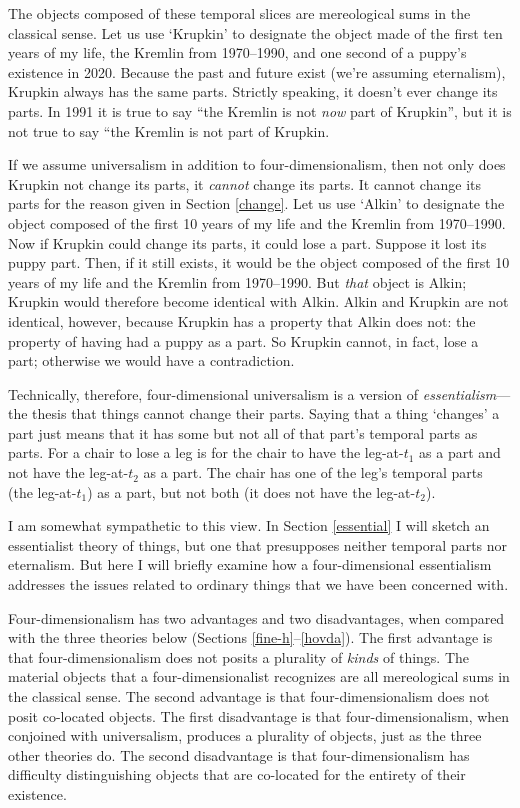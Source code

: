 \documentclass[11pt]{article}
\begin{document}
\begin{spacing}{1.5}
The objects composed of these temporal slices are mereological sums in
the classical sense.  Let us use `Krupkin' to designate the object
made of the first ten years of my life, the Kremlin from 1970--1990,
and one second of a puppy's existence in 2020.  Because the past and
future exist (we're assuming eternalism), Krupkin always has the same
parts.  Strictly speaking, it doesn't ever change its parts.  In 1991
it is true to say ``the Kremlin is not {\em now} part of Krupkin'',
but it is not true to say ``the Kremlin is not part of Krupkin.

If we assume universalism in addition to four-dimensionalism, then not
only does Krupkin not change its parts, it {\em cannot} change its
parts.  It cannot change its parts for the reason given in Section
\ref{change}.  Let us use `Alkin' to designate the object composed of
the first 10 years of my life and the Kremlin from 1970--1990.  Now if
Krupkin could change its parts, it could lose a part.  Suppose it lost
its puppy part.  Then, if it still exists, it would be the object
composed of the first 10 years of my life and the Kremlin from
1970--1990.  But {\em that} object is Alkin; Krupkin would therefore
become identical with Alkin.  Alkin and Krupkin are not identical,
however, because Krupkin has a property that Alkin does not: the
property of having had a puppy as a part.  So Krupkin cannot, in fact,
lose a part; otherwise we would have a contradiction.

Technically, therefore, four-dimensional universalism is a version of
{\em essentialism}---the thesis that things cannot change their parts.
Saying that a thing `changes' a part just means that it has some but
not all of that part's temporal parts as parts.  For a chair to lose a
leg is for the chair to have the leg-at-$t_1$ as a part and not have
the leg-at-$t_2$ as a part.  The chair has one of the leg's temporal
parts (the leg-at-$t_1$) as a part, but not both (it does not have the
leg-at-$t_2$).

I am somewhat sympathetic to this view.  In Section \ref{essential} I
will sketch an essentialist theory of things, but one that presupposes
neither temporal parts nor eternalism.  But here I will briefly
examine how a four-dimensional essentialism addresses the issues
related to ordinary things that we have been concerned with.

Four-dimensionalism has two advantages and two disadvantages, when
compared with the three theories below (Sections
\ref{fine-h}--\ref{hovda}).  The first advantage is that
four-dimensionalism does not posits a plurality of {\em kinds} of
things.  The material objects that a four-dimensionalist recognizes
are all mereological sums in the classical sense.  The second
advantage is that four-dimensionalism does not posit co-located
objects.  The first disadvantage is that four-dimensionalism, when
conjoined with universalism, produces a plurality of objects, just as
the three other theories do.  The second disadvantage is that
four-dimensionalism has difficulty distinguishing objects that are
co-located for the entirety of their existence.


\end{spacing}
\end{document}
